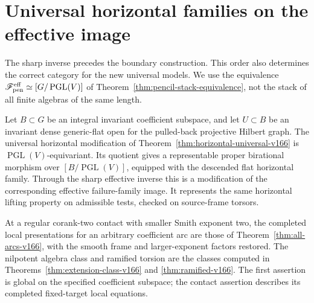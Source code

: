\section{Universal horizontal families on the effective image}
\label{sec:effective-horizontal-v166}
The sharp inverse precedes the boundary construction. This order
also determines the correct category for the new universal models.
We use the equivalence
$\mathscr F_{\rm pen}^{\rm eff}\simeq[G/\operatorname{PGL}(V)]$
of Theorem~\ref{thm:pencil-stack-equivalence}, not the stack of all
finite algebras of the same length.

\begin{proposition}
\label{prop:effective-horizontal-v166}
Let $B\subset G$ be an integral invariant coefficient subspace,
and let $U\subset B$ be an invariant dense generic-flat open for
the pulled-back projective Hilbert graph. The universal horizontal
modification of Theorem~\ref{thm:horizontal-universal-v166} is
$\operatorname{PGL}(V)$-equivariant. Its quotient gives a
representable proper birational morphism over
$[B/\operatorname{PGL}(V)]$, equipped with the descended flat
horizontal family. Through the sharp effective inverse this is a
modification of the corresponding effective failure-family image.
It represents the same horizontal lifting property on admissible
tests, checked on source-frame torsors.

At a regular corank-two contact with smaller Smith exponent two,
the completed local presentations for an arbitrary coefficient arc
are those of Theorem~\ref{thm:all-arcs-v166}, with the smooth frame
and larger-exponent factors restored. The nilpotent algebra class
and ramified torsion are the classes computed in
Theorems~\ref{thm:extension-class-v166} and
\ref{thm:ramified-v166}. The first assertion is global on the
specified coefficient subspace; the contact assertion describes
its completed fixed-target local equations.
\end{proposition}
